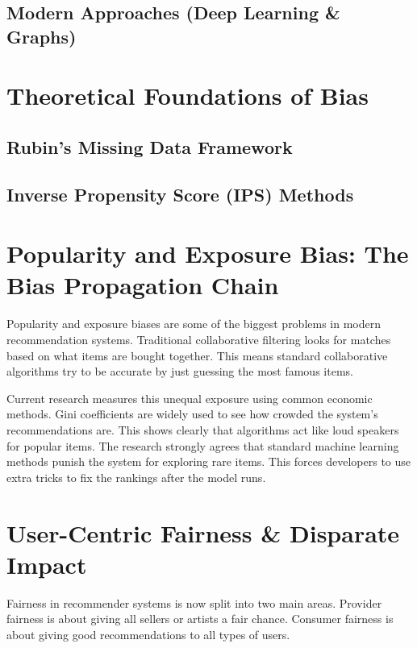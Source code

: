 \documentclass[11pt,a4paper]{report}
\begin{document}
\subsection{Modern Approaches (Deep Learning \& Graphs)}

\section{Theoretical Foundations of Bias}

\subsection{Rubin's Missing Data Framework}

\subsection{Inverse Propensity Score (IPS) Methods}

\section{Popularity and Exposure Bias: The Bias Propagation Chain}
Popularity and exposure biases are some of the biggest problems in modern recommendation systems. Traditional collaborative filtering looks for matches based on what items are bought together. This means standard collaborative algorithms try to be accurate by just guessing the most famous items.

Current research measures this unequal exposure using common economic methods. Gini coefficients are widely used to see how crowded the system's recommendations are. This shows clearly that algorithms act like loud speakers for popular items. The research strongly agrees that standard machine learning methods punish the system for exploring rare items. This forces developers to use extra tricks to fix the rankings after the model runs.

\section{User-Centric Fairness \& Disparate Impact}
Fairness in recommender systems is now split into two main areas. Provider fairness is about giving all sellers or artists a fair chance. Consumer fairness is about giving good recommendations to all types of users.
\end{document}
